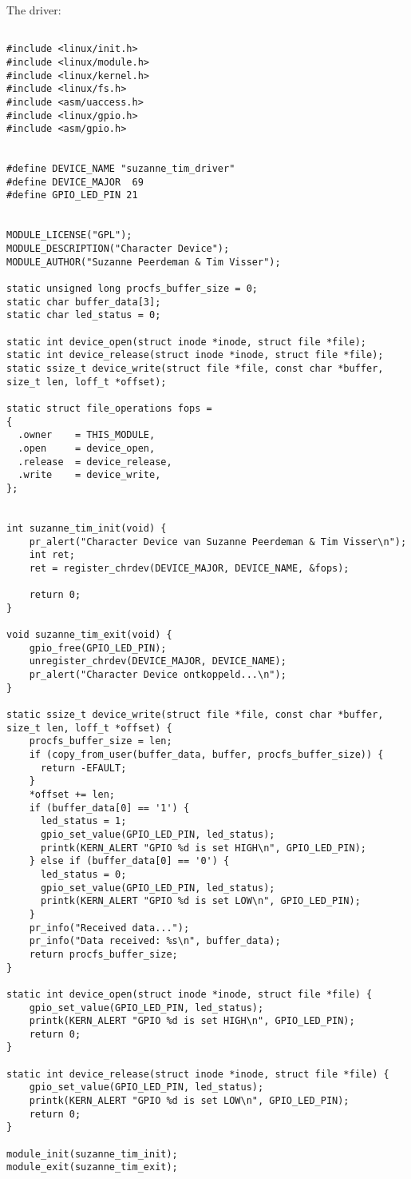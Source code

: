 \documentclass[
10pt, %
a4paper, %
oneside, %
headinclude,footinclude, %
BCOR5mm, %
]{scrartcl}
\begin{document}
The driver:

\begin{lstlisting}

#include <linux/init.h>
#include <linux/module.h>
#include <linux/kernel.h>
#include <linux/fs.h>
#include <asm/uaccess.h>
#include <linux/gpio.h>
#include <asm/gpio.h>


#define DEVICE_NAME "suzanne_tim_driver"
#define DEVICE_MAJOR  69
#define GPIO_LED_PIN 21


MODULE_LICENSE("GPL");
MODULE_DESCRIPTION("Character Device");
MODULE_AUTHOR("Suzanne Peerdeman & Tim Visser");

static unsigned long procfs_buffer_size = 0;
static char buffer_data[3];
static char led_status = 0;

static int device_open(struct inode *inode, struct file *file);
static int device_release(struct inode *inode, struct file *file);
static ssize_t device_write(struct file *file, const char *buffer, size_t len, loff_t *offset);

static struct file_operations fops = 
{
  .owner    = THIS_MODULE,
  .open     = device_open,
  .release  = device_release,
  .write    = device_write,
};


int suzanne_tim_init(void) {
	pr_alert("Character Device van Suzanne Peerdeman & Tim Visser\n");
	int ret;
	ret = register_chrdev(DEVICE_MAJOR, DEVICE_NAME, &fops);

	return 0;
}

void suzanne_tim_exit(void) {
	gpio_free(GPIO_LED_PIN);
	unregister_chrdev(DEVICE_MAJOR, DEVICE_NAME);
	pr_alert("Character Device ontkoppeld...\n");
}

static ssize_t device_write(struct file *file, const char *buffer, size_t len, loff_t *offset) {
	procfs_buffer_size = len;
	if (copy_from_user(buffer_data, buffer, procfs_buffer_size)) {
	  return -EFAULT;
	}
	*offset += len;
	if (buffer_data[0] == '1') {
	  led_status = 1;
	  gpio_set_value(GPIO_LED_PIN, led_status);
	  printk(KERN_ALERT "GPIO %d is set HIGH\n", GPIO_LED_PIN);
	} else if (buffer_data[0] == '0') {
	  led_status = 0;
	  gpio_set_value(GPIO_LED_PIN, led_status);
	  printk(KERN_ALERT "GPIO %d is set LOW\n", GPIO_LED_PIN);
	}
	pr_info("Received data...");
	pr_info("Data received: %s\n", buffer_data);
	return procfs_buffer_size;
}

static int device_open(struct inode *inode, struct file *file) {
	gpio_set_value(GPIO_LED_PIN, led_status);
	printk(KERN_ALERT "GPIO %d is set HIGH\n", GPIO_LED_PIN);
	return 0;
}

static int device_release(struct inode *inode, struct file *file) {
	gpio_set_value(GPIO_LED_PIN, led_status);
	printk(KERN_ALERT "GPIO %d is set LOW\n", GPIO_LED_PIN);
	return 0;
}

module_init(suzanne_tim_init);
module_exit(suzanne_tim_exit);

\end{lstlisting}
\end{document}
